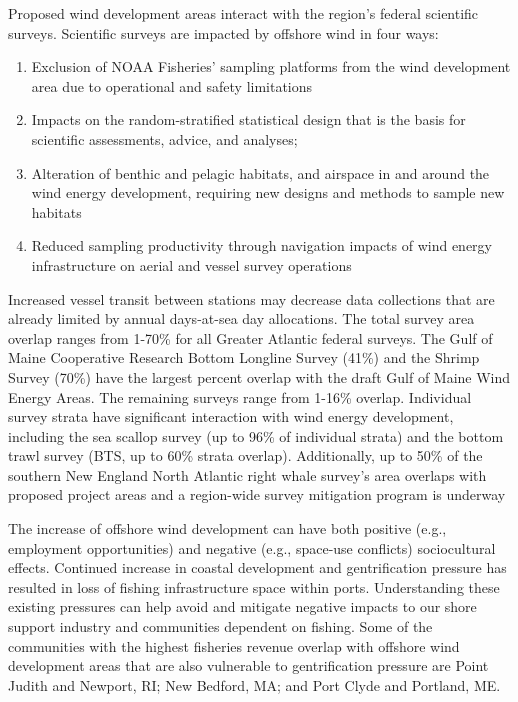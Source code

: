\documentclass[
  10pt,
]{article}
\providecommand{\tightlist}{%
  \setlength{\itemsep}{0pt}\setlength{\parskip}{0pt}}
\begin{document}
Proposed wind development areas interact with the region's federal scientific surveys. Scientific surveys are impacted by offshore wind in four ways:

\begin{enumerate}
\def\labelenumi{\arabic{enumi}.}
\tightlist
\item
  Exclusion of NOAA Fisheries' sampling platforms from the wind development area due to operational and safety limitations
\item
  Impacts on the random-stratified statistical design that is the basis for scientific assessments, advice, and analyses;
\item
  Alteration of benthic and pelagic habitats, and airspace in and around the wind energy development, requiring new designs and methods to sample new habitats
\item
  Reduced sampling productivity through navigation impacts of wind energy infrastructure on aerial and vessel survey operations
\end{enumerate}

Increased vessel transit between stations may decrease data collections that are already limited by annual days-at-sea day allocations. The total survey area overlap ranges from 1-70\% for all Greater Atlantic federal surveys. The Gulf of Maine Cooperative Research Bottom Longline Survey (41\%) and the Shrimp Survey (70\%) have the largest percent overlap with the draft Gulf of Maine Wind Energy Areas. The remaining surveys range from 1-16\% overlap. Individual survey strata have significant interaction with wind energy development, including the sea scallop survey (up to 96\% of individual strata) and the bottom trawl survey (BTS, up to 60\% strata overlap). Additionally, up to 50\% of the southern New England North Atlantic right whale survey's area overlaps with proposed project areas and a region-wide survey mitigation program is underway

The increase of offshore wind development can have both positive (e.g., employment opportunities) and negative (e.g., space-use conflicts) sociocultural effects. Continued increase in coastal development and gentrification pressure has resulted in loss of fishing infrastructure space within ports. Understanding these existing pressures can help avoid and mitigate negative impacts to our shore support industry and communities dependent on fishing. Some of the communities with the highest fisheries revenue overlap with offshore wind development areas that are also vulnerable to gentrification pressure are Point Judith and Newport, RI; New Bedford, MA; and Port Clyde and Portland, ME.
\end{document}
